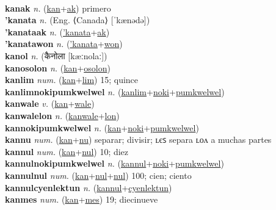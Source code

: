  \label{'kanawon} \\
\textbf{kanak} \textit{n.} (\hyperref[kan]{kan}+\hyperref[ak]{ak})
primero \label{kanak} \\
\textbf{'kanata} \textit{n.} (Eng. ⟨Canada⟩ [ˈkænədə])
 \label{'kanata} \\
\textbf{'kanataak} \textit{n.} (\hyperref['kanata]{'kanata}+\hyperref[ak]{ak})
 \label{'kanataak} \\
\textbf{'kanatawon} \textit{n.} (\hyperref['kanata]{'kanata}+\hyperref[won]{won})
 \label{'kanatawon} \\
\textbf{kanol} \textit{n.} ({\devanagari{}कैनोला} [kæːnolaː])
 \label{kanol} \\
\textbf{kanosolon} \textit{n.} (\hyperref[kan]{kan}+\hyperref[osolon]{osolon})
 \label{kanosolon} \\
\textbf{kanlim} \textit{num.} (\hyperref[kan]{kan}+\hyperref[lim]{lim})
15; quince \label{kanlim} \\
\textbf{kanlimnokipumkwelwel} \textit{n.} (\hyperref[kanlim]{kanlim}+\hyperref[noki]{noki}+\hyperref[pumkwelwel]{pumkwelwel})
 \label{kanlimnokipumkwelwel} \\
\textbf{kanwale} \textit{v.} (\hyperref[kan]{kan}+\hyperref[wale]{wale})
 \label{kanwale} \\
\textbf{kanwalelon} \textit{n.} (\hyperref[kanwale]{kanwale}+\hyperref[lon]{lon})
 \label{kanwalelon} \\
\textbf{kannokipumkwelwel} \textit{n.} (\hyperref[kan]{kan}+\hyperref[noki]{noki}+\hyperref[pumkwelwel]{pumkwelwel})
 \label{kannokipumkwelwel} \\
\textbf{kannu} \textit{num.} (\hyperref[kan]{kan}+\hyperref[nu]{nu})
separar; divisir; ʟєꜱ separa ʟᴏᴧ a muchas partes \label{kannu} \\
\textbf{kannul} \textit{num.} (\hyperref[kan]{kan}+\hyperref[nul]{nul})
10; diez \label{kannul} \\
\textbf{kannulnokipumkwelwel} \textit{n.} (\hyperref[kannul]{kannul}+\hyperref[noki]{noki}+\hyperref[pumkwelwel]{pumkwelwel})
 \label{kannulnokipumkwelwel} \\
\textbf{kannulnul} \textit{num.} (\hyperref[kan]{kan}+\hyperref[nul]{nul}+\hyperref[nul]{nul})
100; cien; ciento \label{kannulnul} \\
\textbf{kannulcyenlektun} \textit{n.} (\hyperref[kannul]{kannul}+\hyperref[cyenlektun]{cyenlektun})
 \label{kannulcyenlektun} \\
\textbf{kanmes} \textit{num.} (\hyperref[kan]{kan}+\hyperref[mes]{mes})
19; diecinueve \label{kanmes} \\

